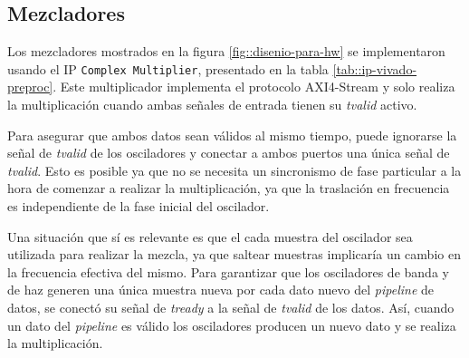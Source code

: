 \documentclass[../../main.tex]{subfiles}
\begin{document}
\begin{table}[H]
    \centering
    \caption{Parametros configurados en los osciladores para la etapa de preprocesamiento.}\label{tab::osciladores-conf-preproc} 
    \end{table}

\subsection{Mezcladores}
Los mezcladores mostrados en la figura \ref{fig::disenio-para-hw} se implementaron usando el IP \texttt{Complex Multiplier}, presentado en la tabla \ref{tab::ip-vivado-preproc}. Este multiplicador implementa el protocolo AXI4-Stream y solo realiza la multiplicación cuando ambas señales de entrada tienen su \textit{tvalid} activo.

Para asegurar que ambos datos sean válidos al mismo tiempo, puede ignorarse la señal de \textit{tvalid} de los osciladores y conectar a ambos puertos una única señal de \textit{tvalid}. Esto es posible ya que no se necesita un sincronismo de fase particular a la hora de comenzar a realizar la multiplicación, ya que la traslación en frecuencia es independiente de la fase inicial del oscilador. 

Una situación que sí es relevante es que el cada muestra del oscilador sea utilizada para realizar la mezcla, ya que saltear muestras implicaría un cambio en la frecuencia efectiva del mismo. 
Para garantizar que los osciladores de banda y de haz generen una única muestra nueva por cada dato nuevo del \textit{pipeline} de datos, se conectó su señal de \textit{tready} a la señal de \textit{tvalid} de los datos. Así, cuando un dato del \textit{pipeline} es válido los osciladores producen un nuevo dato y se realiza la multiplicación.
\end{document}
